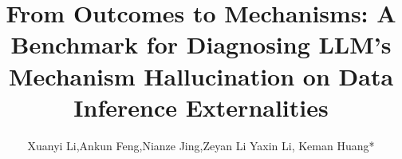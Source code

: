 \documentclass[lettersize,journal]{IEEEtran}
\begin{document}
\title{From Outcomes to Mechanisms: A Benchmark for Diagnosing LLM's Mechanism Hallucination on Data Inference Externalities}

\author{Xuanyi Li,Ankun Feng,Nianze Jing,Zeyan Li Yaxin Li, Keman Huang*}


\end{document}
